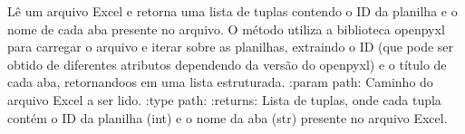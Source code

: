 \documentclass[letterpaper,10pt,english]{sphinxmanual}
\begin{document}
\begin{fulllineitems}
\label{\detokenize{api/excel_io:excel_io.list_sheets_with_ids}}
\pysigstartsignatures
\pysiglinewithargsret
{}
{}
{}
\pysigstopsignatures
\sphinxAtStartPar
Lê um arquivo Excel e retorna uma lista de tuplas contendo o ID da planilha e o nome de cada aba presente no arquivo. O método utiliza a biblioteca openpyxl para carregar o arquivo e iterar sobre as planilhas, extraindo o ID (que pode ser obtido de diferentes atributos dependendo da versão do openpyxl) e o título de cada aba, retornando\sphinxhyphen{}os em uma lista estruturada.
:param path: Caminho do arquivo Excel a ser lido.
:type path: 
:returns: Lista de tuplas, onde cada tupla contém o ID da planilha (int) e o nome da aba (str) presente no arquivo Excel.
\begin{quote}\begin{description}
\sphinxAtStartPar
{}

\end{description}\end{quote}

\end{fulllineitems}


\begin{fulllineitems}
\label{\detokenize{api/excel_io:excel_io.list_sheets}}
\pysigstartsignatures
\pysiglinewithargsret
{}
{}
{}
\pysigstopsignatures\begin{quote}\begin{description}
\sphinxAtStartPar
{}

\end{description}\end{quote}

\end{fulllineitems}
\end{document}

